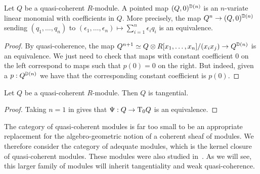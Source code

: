
\begin{lemma}\label{lem:disk-qc}
  Let $Q$ be a quasi-coherent $R$-module.
  A pointed map $(Q,0)^{\D(n)}$ is an $n$-variate linear monomial with coefficients in $Q$. More precisely, the map $Q^n \to (Q,0)^{\D(n)}$ sending $(q_1,\dots,q_n)$ to $(\epsilon_1,\dots,\epsilon_n) \mapsto \sum_{i=1}^n \epsilon_i q_i$ is an equivalence.
\end{lemma}

\begin{proof}
  By quasi-coherence, the map $Q^{n+1} \simeq Q \otimes \quot{R[x_1,\dots,x_n]}{\ideal{x_ix_j}} \to Q^{\D(n)}$ is an equivalence.
  We just need to check that maps with constant coefficient $0$ on the left correspond to maps such that $p(0)=0$ on the right.
  But indeed, given a $p:Q^{\D(n)}$ we have that the corresponding constant coefficient is $p(0)$.
\end{proof}

\begin{proposition}\label{prp:tangential-qc}
  Let $Q$ be a quasi-coherent $R$-module.
  Then $Q$ is tangential.
\end{proposition}

\begin{proof}
  Taking $n=1$ in  gives that $\can : Q\to\tangent{Q}{0}$ is an equivalence.
\end{proof}



The category of quasi-coherent modules is far too small to be an appropriate replacement for the algebro-geometric notion of a coherent sheaf of modules.
We therefore consider the category of adequate modules, which is the kernel closure of quasi-coherent modules.
These modules were also studied
in~\cite[\href{https://stacks.math.columbia.edu/tag/06Z1}{Tag 06Z1}]{stacks-project}.
As we will see, this larger family of modules will inherit tangentiality and weak quasi-coherence.

